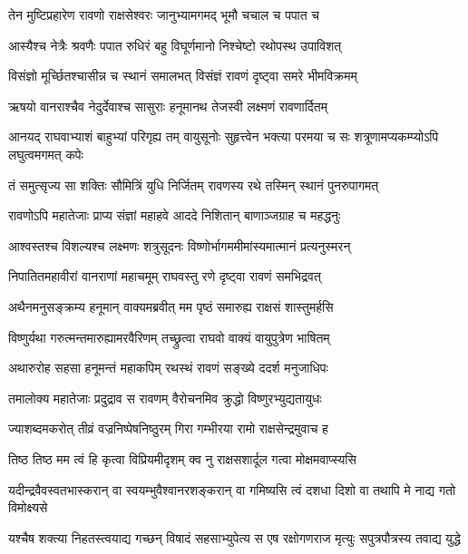 \twolineshloka
{तेन मुष्टिप्रहारेण रावणो राक्षसेश्वरः}
{जानुभ्यामगमद् भूमौ चचाल च पपात च} %

\twolineshloka
{आस्यैश्च नेत्रैः श्रवणैः पपात रुधिरं बहु}
{विघूर्णमानो निश्चेष्टो रथोपस्थ उपाविशत्} %

\twolineshloka
{विसंज्ञो मूर्च्छितश्चासीन्न च स्थानं समालभत्}
{विसंज्ञं रावणं दृष्ट्वा समरे भीमविक्रमम्} %

\twolineshloka
{ऋषयो वानराश्चैव नेदुर्देवाश्च सासुराः}
{हनूमानथ तेजस्वी लक्ष्मणं रावणार्दितम्} %

\threelineshloka
{आनयद् राघवाभ्याशं बाहुभ्यां परिगृह्य तम्}
{वायुसूनोः सुहृत्त्वेन भक्त्या परमया च सः}
{शत्रूणामप्यकम्प्योऽपि लघुत्वमगमत् कपेः} %

\twolineshloka
{तं समुत्सृज्य सा शक्तिः सौमित्रिं युधि निर्जितम्}
{रावणस्य रथे तस्मिन् स्थानं पुनरुपागमत्} %

\twolineshloka
{रावणोऽपि महातेजाः प्राप्य संज्ञां महाहवे}
{आददे निशितान् बाणाञ्जग्राह च महद्धनुः} %

\twolineshloka
{आश्वस्तश्च विशल्यश्च लक्ष्मणः शत्रुसूदनः}
{विष्णोर्भागममीमांस्यमात्मानं प्रत्यनुस्मरन्} %

\twolineshloka
{निपातितमहावीरां वानराणां महाचमूम्}
{राघवस्तु रणे दृष्ट्वा रावणं समभिद्रवत्} %

\twolineshloka
{अथैनमनुसङ्क्रम्य हनूमान् वाक्यमब्रवीत्}
{मम पृष्ठं समारुह्य राक्षसं शास्तुमर्हसि} %

\twolineshloka
{विष्णुर्यथा गरुत्मन्तमारुह्यामरवैरिणम्}
{तच्छ्रुत्वा राघवो वाक्यं वायुपुत्रेण भाषितम्} %

\twolineshloka
{अथारुरोह सहसा हनूमन्तं महाकपिम्}
{रथस्थं रावणं सङ्ख्ये ददर्श मनुजाधिपः} %

\twolineshloka
{तमालोक्य महातेजाः प्रदुद्राव स रावणम्}
{वैरोचनमिव क्रुद्धो विष्णुरभ्युद्यतायुधः} %

\twolineshloka
{ज्याशब्दमकरोत् तीव्रं वज्रनिष्पेषनिष्ठुरम्}
{गिरा गम्भीरया रामो राक्षसेन्द्रमुवाच ह} %

\twolineshloka
{तिष्ठ तिष्ठ मम त्वं हि कृत्वा विप्रियमीदृशम्}
{क्व नु राक्षसशार्दूल गत्वा मोक्षमवाप्स्यसि} %

\twolineshloka
{यदीन्द्रवैवस्वतभास्करान् वा स्वयम्भुवैश्वानरशङ्करान् वा}
{गमिष्यसि त्वं दशधा दिशो वा तथापि मे नाद्य गतो विमोक्ष्यसे} %

\twolineshloka
{यश्चैष शक्त्या निहतस्त्वयाद्य गच्छन् विषादं सहसाभ्युपेत्य}
{स एष रक्षोगणराज मृत्युः सपुत्रपौत्रस्य तवाद्य युद्धे} %


